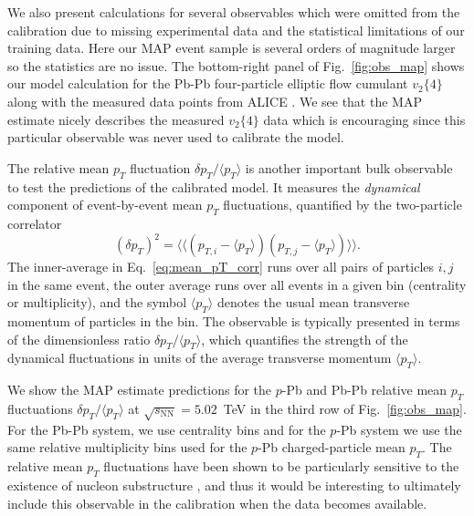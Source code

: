 \documentclass[aps,prc,reprint,amsmath,nofootinbib]{revtex4-1}
\newcommand{\sqrts}{\sqrt{s_\mathrm{NN}}}
\newcommand{\vnk}[2]{v_#1\{#2\}}
\begin{document}
We also present calculations for several observables which were omitted from the calibration due to missing experimental data and the statistical limitations of our training data.
Here our MAP event sample is several orders of magnitude larger so the statistics are no issue.
The bottom-right panel of Fig.~\ref{fig:obs_map} shows our model calculation for the Pb-Pb four-particle elliptic flow cumulant $\vnk{2}{4}$ along with the measured data points from \mbox{ALICE} \cite{Adam:2016izf}.
We see that the MAP estimate nicely describes the measured $\vnk{2}{4}$ data which is encouraging since this particular observable was never used to calibrate the model.

The relative mean $p_T$ fluctuation $\delta p_T / \langle p_T \rangle$ is another important bulk observable to test the predictions of the calibrated model.
It measures the \emph{dynamical} component of event-by-event mean $p_T$ fluctuations, quantified by the two-particle correlator
\begin{equation}
  \label{eq:mean_pT_corr}
  (\delta p_T)^2 = \langle \langle (p_{T,i} - \langle p_T \rangle) (p_{T,j} - \langle p_T \rangle) \rangle \rangle.
\end{equation}
The inner-average in Eq.~\eqref{eq:mean_pT_corr} runs over all pairs of particles $i,j$ in the same event, the outer average runs over all events in a given bin (centrality or multiplicity), and the symbol $\langle p_T \rangle$ denotes the usual mean transverse momentum of particles in the bin.
The observable is typically presented in terms of the dimensionless ratio $\delta p_T / \langle p_T \rangle$, which quantifies the strength of the dynamical fluctuations in units of the average transverse momentum $\langle p_T \rangle$.

We show the MAP estimate predictions for the $p$-Pb and Pb-Pb relative mean $p_T$ fluctuations $\delta p_T / \langle p_T \rangle$ at $\sqrts=5.02$~TeV in the third row of Fig.~\ref{fig:obs_map}.
For the Pb-Pb system, we use centrality bins and for the $p$-Pb system we use the same relative multiplicity bins used for the $p$-Pb charged-particle mean $p_T$.
The relative mean $p_T$ fluctuations have been shown to be particularly sensitive to the existence of nucleon substructure \cite{Bozek:2017elk}, and thus it would be interesting to ultimately include this observable in the calibration when the data becomes available.
\end{document}
